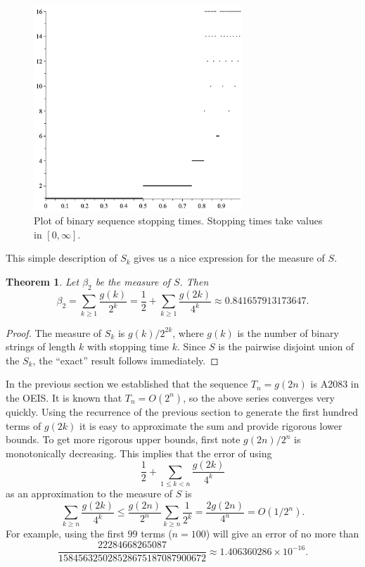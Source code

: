 \documentclass[12pt]{amsart}
\newtheorem{theorem}{Theorem}
\theoremstyle{definition}
\begin{document}
\begin{figure}
\includegraphics[width=0.7\textwidth]{fig1.png}
\caption{Plot of binary sequence stopping times. Stopping times take values in $[0,\infty].$}
\end{figure}

This simple description of $S_k$ gives us a nice expression for the measure of
$S$.

\begin{theorem}
    Let $\beta_2$ be the measure of $S$. Then
    \begin{equation*}
        \beta_2 = \sum_{k \geq 1} \frac{g(k)}{2^k} = \frac{1}{2} + \sum_{k \geq 1} \frac{g(2k)}{4^k}
        \approx 0.841657913173647.
    \end{equation*}
\end{theorem}

\begin{proof}
    The measure of $S_k$ is $g(k) / 2^{2k}$, where $g(k)$ is the number of
    binary strings of length $k$ with stopping time $k$. Since $S$ is the
    pairwise disjoint union of the $S_k$, the ``exact'' result follows
    immediately.
\end{proof}

In the previous section we established that the sequence $T_n = g(2n)$ is
A2083 in the OEIS. It is known that $T_n = O(2^n)$, so the above series
converges very quickly. Using the recurrence of the previous section to
generate the first hundred terms of $g(2k)$ it is easy to approximate the sum
and provide rigorous lower bounds. To get more rigorous upper bounds, first
note $g(2n) / 2^n$ is monotonically decreasing. This implies that the error of
using
\begin{equation*}
    \frac{1}{2} + \sum_{1 \leq k < n} \frac{g(2k)}{4^k}
\end{equation*}
as an approximation to the measure of $S$ is
\begin{equation*}
    \sum_{k \geq n} \frac{g(2k)}{4^k}
        \leq \frac{g(2n)}{2^n} \sum_{k \geq n} \frac{1}{2^k}
        = \frac{2g(2n)}{4^n}
        = O(1/2^n).
\end{equation*}
For example, using the first $99$ terms ($n = 100$) will give an error of no
more than
\begin{equation*}
    \frac{22284668265087}{158456325028528675187087900672}
    \approx 1.406360286 \times 10^{-16}.
\end{equation*}
\end{document}
